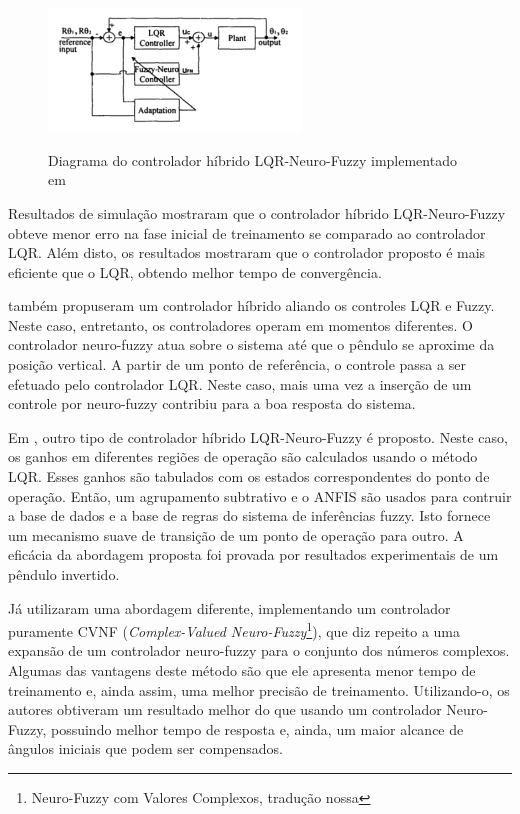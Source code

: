 \begin{figure}[!htb]
    \centering
    \caption{Diagrama do controlador híbrido LQR-Neuro-Fuzzy implementado em \cite{Kim2000}}
    \includegraphics[width=0.6\textwidth]{./04-figuras/lqr_neuro_fuzzy_pendulum}
    \label{fig:lqr-neuro-fuzzy-kim2000}
\end{figure}

Resultados de simulação mostraram que o controlador híbrido LQR-Neuro-Fuzzy obteve menor erro na fase inicial de treinamento se comparado ao controlador LQR. Além disto, os resultados mostraram que o controlador proposto é mais eficiente que o LQR, obtendo melhor tempo de convergência.

 também propuseram um controlador híbrido aliando os controles LQR e Fuzzy. Neste caso, entretanto, os controladores operam em momentos diferentes. O controlador neuro-fuzzy atua sobre o sistema até que o pêndulo se aproxime da posição vertical. A partir de um ponto de referência, o controle passa a ser efetuado pelo controlador LQR. Neste caso, mais uma vez a inserção de um controle por neuro-fuzzy contribiu para a boa resposta do sistema.

Em \cite{Alata2001}, outro tipo de controlador híbrido LQR-Neuro-Fuzzy é proposto. Neste caso, os ganhos em diferentes regiões de operação são calculados usando o método LQR. Esses ganhos são tabulados com os estados correspondentes do ponto de operação. Então, um agrupamento subtrativo e o ANFIS são usados para contruir a base de dados e a base de regras do sistema de inferências fuzzy. Isto fornece um mecanismo suave de transição de um ponto de operação para outro. A eficácia da abordagem proposta foi provada por resultados experimentais de um pêndulo invertido.

Já  utilizaram uma abordagem diferente, implementando um controlador puramente CVNF (\textit{Complex-Valued Neuro-Fuzzy}\footnote{Neuro-Fuzzy com Valores Complexos, tradução nossa}), que diz repeito a uma expansão de um controlador neuro-fuzzy para o conjunto dos números complexos. Algumas das vantagens deste método são que ele apresenta menor tempo de treinamento e, ainda assim, uma melhor precisão de treinamento. Utilizando-o, os autores obtiveram um resultado melhor do que usando um controlador Neuro-Fuzzy, possuindo melhor tempo de resposta e, ainda, um maior alcance de ângulos iniciais que podem ser compensados.

